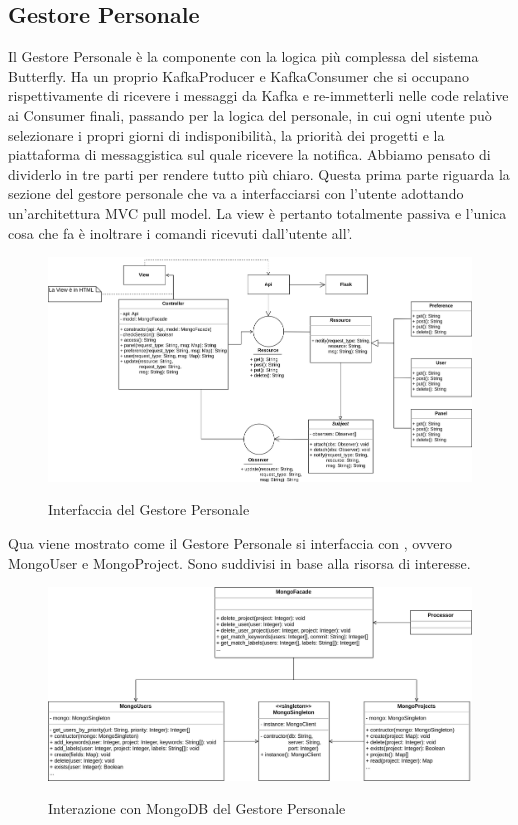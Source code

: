 \subsection{Gestore Personale}
Il Gestore Personale è la componente con la logica più complessa del sistema Butterfly. Ha un proprio KafkaProducer e KafkaConsumer
che si occupano rispettivamente di ricevere i messaggi da Kafka e re-immetterli nelle code relative ai Consumer finali, passando per la logica
del personale, in cui ogni utente può selezionare i propri giorni di indisponibilità, la priorità dei progetti e la piattaforma di messaggistica sul
quale ricevere la notifica. Abbiamo pensato di dividerlo in tre parti per rendere tutto più chiaro.\newline
Questa prima parte riguarda la sezione del gestore personale che va a interfacciarsi con l’utente adottando un’architettura MVC pull model.
La view è pertanto totalmente passiva e l’unica cosa che fa è inoltrare i comandi ricevuti dall’utente all’.

\begin{figure}[H]
    \centering
    \includegraphics[width=\textwidth]{img/GP-Processor.png}\\
    \caption{Interfaccia del Gestore Personale}
    \label{fig:GP-Processor}
\end{figure}

Qua viene mostrato come il Gestore Personale si interfaccia con , ovvero MongoUser e MongoProject. Sono suddivisi in base alla risorsa di interesse.

\begin{figure}[H]
    \centering
    \includegraphics[width=\textwidth]{img/GP-Mongo.png}\\
    \caption{Interazione con MongoDB del Gestore Personale}
    \label{fig:GP-Mongo}
\end{figure}


